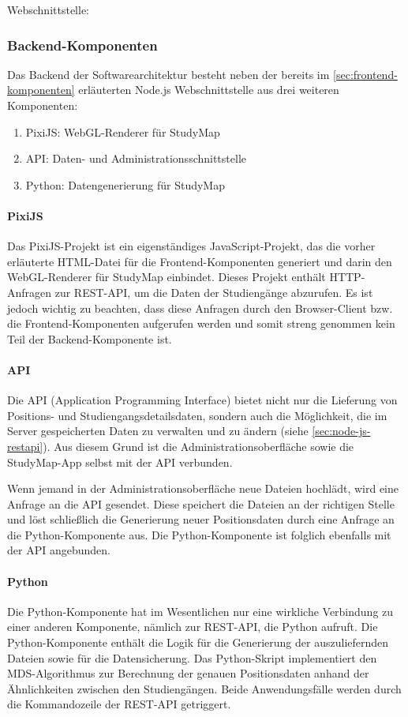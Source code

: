\noindent
Webschnittstelle: 

\subsubsection{Backend-Komponenten}
Das Backend der Softwarearchitektur besteht neben der bereits im \autoref{sec:frontend-komponenten} erläuterten Node.js Webschnittstelle aus drei weiteren Komponenten: \begin{enumerate}
    \item PixiJS: WebGL-Renderer für StudyMap
    \item API: Daten- und Administrationsschnittstelle
    \item Python: Datengenerierung für StudyMap
\end{enumerate}

\paragraph*{PixiJS}
Das PixiJS-Projekt ist ein eigenständiges JavaScript-Projekt, das die vorher erläuterte HTML-Datei  für die Frontend-Komponenten generiert und darin den WebGL-Renderer für StudyMap einbindet. Dieses Projekt enthält HTTP-Anfragen zur REST-API, um die Daten der Studiengänge abzurufen. Es ist jedoch wichtig zu beachten, dass diese Anfragen durch den Browser-Client bzw. die Frontend-Komponenten aufgerufen werden und somit streng genommen kein Teil der Backend-Komponente ist.

\paragraph*{API}
Die API (Application Programming Interface) bietet nicht nur die Lieferung von Positions- und Studiengangsdetailsdaten, sondern auch die Möglichkeit, die im Server gespeicherten Daten zu verwalten und zu ändern (siehe \autoref{sec:node-js-restapi}). Aus diesem Grund ist die Administrationsoberfläche sowie die StudyMap-App selbst mit der API verbunden.

Wenn jemand in der Administrationsoberfläche neue Dateien hochlädt, wird eine Anfrage an die API gesendet. Diese speichert die Dateien an der richtigen Stelle und löst schließlich die Generierung neuer Positionsdaten durch eine Anfrage an die Python-Komponente aus. Die Python-Komponente ist folglich ebenfalls mit der API angebunden.

\paragraph*{Python}
Die Python-Komponente hat im Wesentlichen nur eine wirkliche Verbindung zu einer anderen Komponente, nämlich zur REST-API, die Python aufruft. Die Python-Komponente enthält die Logik für die Generierung der auszuliefernden Dateien sowie für die Datensicherung. Das Python-Skript implementiert den MDS-Algorithmus zur Berechnung der genauen Positionsdaten anhand der Ähnlichkeiten zwischen den Studiengängen. Beide Anwendungsfälle werden durch die Kommandozeile der REST-API getriggert.

